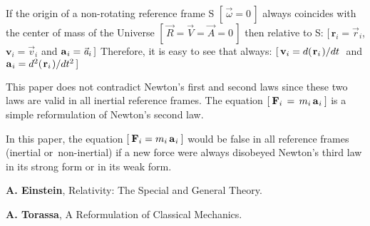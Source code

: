 \documentclass[10pt]{article}
\begin{document}
\par \bigskip\smallskip \noindent If the origin of a non-rotating reference frame S $[ \, {\vec{\omega}} = 0 \, ]$ always coincides with the center of mass of the Universe $[ \, {\vec{\mathit{R}}} = {\vec{\mathit{V}}} = {\vec{\mathit{A}}} = 0 \, ]$ then relative to S: $[ \, {\mathbf{r}}_i = {\vec{\mathit{r}}}_i$, ${\mathbf{v}}_i = {\vec{\mathit{v}}}_i$ and ${\mathbf{a}}_{\hspace{+0.045em}i} = {\vec{\mathit{a}}}_i \, ]$ Therefore, it is easy to see that always: $[ \, {\mathbf{v}}_i = d(\hspace{+0.090em}{\mathbf{r}}_i\hspace{+0.090em})/dt$ $\;$and$\;$ ${\mathbf{a}}_{\hspace{+0.045em}i} = d^2(\hspace{+0.090em}{\mathbf{r}}_i\hspace{+0.090em})/dt^2 \, ]$

\par \bigskip\smallskip \noindent This paper does not contradict Newton's first and second laws since these two laws are valid in all inertial reference frames. The equation $[ \: {\mathbf{F}}_i \,=\, m_i \, {\mathbf{a}}_{\hspace{+0.045em}i} \: ]$ is a simple reformulation of Newton's second law.

\par \bigskip\smallskip \noindent In this paper, the equation $[ \: {\mathbf{F}}_i = m_i \, {\mathbf{a}}_{\hspace{+0.045em}i} \: ]$ would be false in all reference frames (\hspace{+0.180em}inertial \hbox {or non-inertial\hspace{+0.180em})} if a new force were always disobeyed Newton's third law in its strong form or in its weak form.

\vspace{-0.90em}

\par {}

\par \bigskip\smallskip \noindent \textbf{A. Einstein}, Relativity: The Special and General Theory.

\par \bigskip\smallskip \noindent \textbf{A. Torassa}, A Reformulation of Classical Mechanics.
\end{document}
